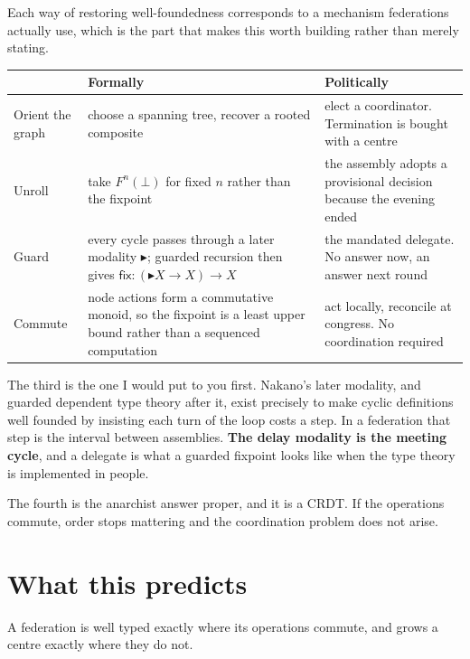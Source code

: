 \documentclass[11pt,a4paper]{article}
\begin{document}
Each way of restoring well-foundedness corresponds to a mechanism federations
actually use, which is the part that makes this worth building rather than merely
stating.

\begin{center}
\begin{tabular}{@{}l@{\hspace{4mm}}>{\raggedright\arraybackslash}p{}@{\hspace{4mm}}>{\raggedright\arraybackslash}p{}@{}}
\toprule
& \textbf{Formally} & \textbf{Politically} \\
\midrule
Orient the graph & choose a spanning tree, recover a rooted composite &
  elect a coordinator. Termination is bought with a centre \\[1.5mm]
Unroll & take $F^n(\bot)$ for fixed $n$ rather than the fixpoint &
  the assembly adopts a provisional decision because the evening ended \\[1.5mm]
Guard & every cycle passes through a later modality $\blacktriangleright$;
  guarded recursion then gives $\mathsf{fix} : (\blacktriangleright X \to X) \to X$ &
  the mandated delegate. No answer now, an answer next round \\[1.5mm]
Commute & node actions form a commutative monoid, so the fixpoint is a least upper
  bound rather than a sequenced computation &
  act locally, reconcile at congress. No coordination required \\
\bottomrule
\end{tabular}
\end{center}

The third is the one I would put to you first. Nakano's later modality, and
guarded dependent type theory after it, exist precisely to make cyclic definitions
well founded by insisting each turn of the loop costs a step. In a federation that
step is the interval between assemblies. \textbf{The delay modality is the meeting
cycle}, and a delegate is what a guarded fixpoint looks like when the type theory
is implemented in people.

The fourth is the anarchist answer proper, and it is a CRDT. If the operations
commute, order stops mattering and the coordination problem does not arise.

\section{What this predicts}

\begin{sectionbox}
A federation is well typed exactly where its operations commute, and grows a
centre exactly where they do not.
\end{sectionbox}
\end{document}
